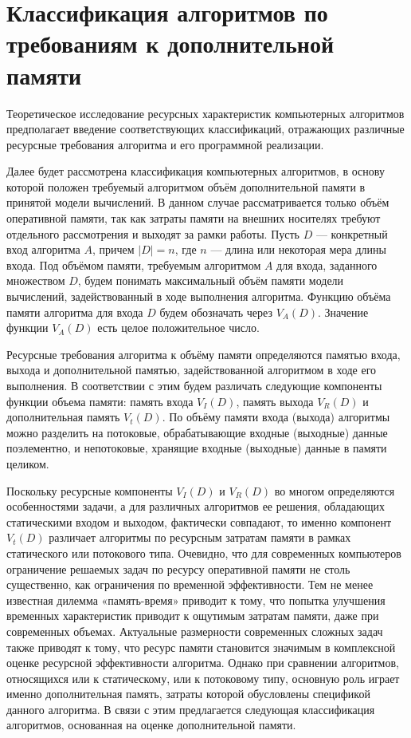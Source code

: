 \section{Классификация алгоритмов по требованиям к дополнительной памяти}
\label{alg_classes}

Теоретическое исследование ресурсных характеристик компьютерных алгоритмов предполагает введение соответствующих классификаций, отражающих различные ресурсные требования алгоритма и его программной реализации.~\cite{uljanov}

Далее будет рассмотрена классификация компьютерных алгоритмов, в основу которой положен требуемый алгоритмом объём дополнительной памяти в принятой модели вычислений. В данном случае рассматривается только объём оперативной
памяти, так как затраты памяти на внешних носителях требуют отдельного рассмотрения и выходят за рамки работы. Пусть $D$ --- конкретный вход алгоритма $A$, причем $|D| = n$, где $n$ --- длина или некоторая мера длины входа. Под объёмом памяти, требуемым алгоритмом $A$ для входа, заданного множеством $D$, будем понимать максимальный объём памяти модели вычислений, задействованный в ходе выполнения алгоритма. Функцию объёма памяти алгоритма для входа $D$ будем обозначать через $V_A(D)$. Значение функции $V_A(D)$ есть целое положительное число.~\cite{uljanov}

Ресурсные требования алгоритма к объёму памяти определяются памятью входа, выхода и дополнительной памятью, задействованной алгоритмом в ходе его выполнения. В соответствии с этим будем различать следующие компоненты функции объема памяти: память входа $V_I(D)$, память выхода $V_R(D)$ и дополнительная память $V_t(D)$. По объёму памяти входа (выхода) алгоритмы можно разделить на потоковые, обрабатывающие входные (выходные) данные поэлементно, и непотоковые, хранящие входные (выходные) данные в памяти целиком.~\cite{uljanov}

Поскольку ресурсные компоненты $V_I(D)$ и $V_R(D)$ во многом определяются особенностями задачи, а для различных алгоритмов ее решения, обладающих статическими входом и выходом, фактически совпадают, то именно компонент $V_t(D)$ различает алгоритмы по ресурсным затратам памяти в рамках статического или потокового типа. Очевидно, что для современных компьютеров ограничение решаемых задач по ресурсу оперативной памяти не столь существенно, как ограничения по временной эффективности. Тем не менее известная дилемма «память-время» приводит к тому, что попытка улучшения временных характеристик приводит к ощутимым затратам памяти, даже при современных объемах. Актуальные размерности современных сложных задач также приводят к тому, что ресурс памяти становится значимым в комплексной оценке ресурсной эффективности алгоритма. Однако при сравнении алгоритмов, относящихся или к статическому, или к потоковому типу, основную роль играет именно дополнительная память, затраты которой обусловлены спецификой данного алгоритма. В связи с этим предлагается следующая классификация алгоритмов, основанная на оценке дополнительной памяти.~\cite{uljanov}

